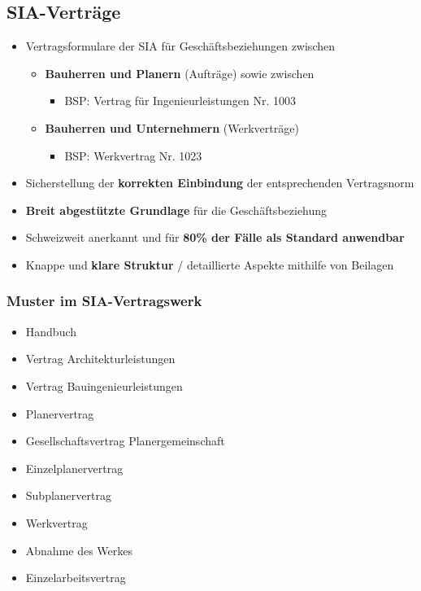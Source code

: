 \subsection{SIA-Verträge}

\begin{itemize}
	\tightlist
	\item Vertragsformulare der SIA für Geschäftsbeziehungen zwischen
	\begin{itemize}
		\tightlist
		\item \textbf{Bauherren und Planern} (Aufträge) sowie zwischen
		\begin{itemize}
			\tightlist
			\item BSP: Vertrag für Ingenieurleistungen Nr. 1003
		\end{itemize}
		\item \textbf{Bauherren und Unternehmern} (Werkverträge)
		\begin{itemize}
			\tightlist
			\item BSP: Werkvertrag Nr. 1023
		\end{itemize}
	\end{itemize}
	\item Sicherstellung der \textbf{korrekten Einbindung} der entsprechenden
	Vertragsnorm
	\item \textbf{Breit abgestützte Grundlage} für die Geschäftsbeziehung
	\item Schweizweit anerkannt und für \textbf{80\% der Fälle als Standard
	anwendbar}
	\item Knappe und \textbf{klare Struktur} / detaillierte Aspekte mithilfe von
	Beilagen
\end{itemize}

\subsubsection{Muster im SIA-Vertragswerk}
\begin{itemize}
	\item Handbuch
	\item Vertrag Architekturleistungen
	\item Vertrag Bauingenieurleistungen
	\item Planervertrag
	\item Gesellschaftsvertrag Planergemeinschaft
	\item Einzelplanervertrag
	\item Subplanervertrag
	\item Werkvertrag
	\item Abnahme des Werkes
	\item Einzelarbeitsvertrag
\end{itemize}


